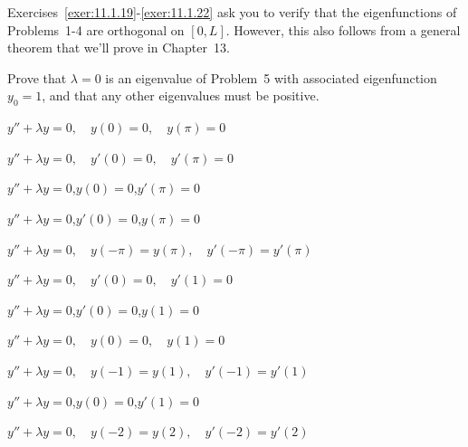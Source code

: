 Exercises~\ref{exer:11.1.19}-\ref{exer:11.1.22} ask you to verify that the eigenfunctions of
Problems~1-4 are orthogonal on $[0,L]$. However, this also follows from a general theorem that we'll
prove in Chapter~13.


\exercises

\begin{exerciselist}
  \item\label{exer:11.1.1} Prove that $\lambda=0$ is an eigenvalue of Problem~5 with associated
        eigenfunction $y_{0}=1$, and that any other eigenvalues must be positive. 


  \item\label{exer:11.1.2} $y''+\lambda y=0,\quad y(0)=0,\quad y(\pi)=0$

  \item\label{exer:11.1.3} $y''+\lambda y=0,\quad y'(0)=0,\quad y'(\pi)=0$

  \item\label{exer:11.1.4} $y''+\lambda y=0$,\quad $y(0)=0$,\quad $y'(\pi)=0$

  \item\label{exer:11.1.5} $y''+\lambda y=0$,\quad $y'(0)=0$,\quad $y(\pi)=0$

  \item\label{exer:11.1.6} $y''+\lambda y=0,\quad y(-\pi)=y(\pi),\quad y'(-\pi)=y'(\pi)$

  \item\label{exer:11.1.7} $y''+\lambda y=0,\quad y'(0)=0,\quad y'(1)=0$

  \item\label{exer:11.1.8} $y''+\lambda y=0$,\quad $y'(0)=0$,\quad $y(1)=0$

  \item\label{exer:11.1.9} $y''+\lambda y=0,\quad y(0)=0,\quad y(1)=0$

  \item\label{exer:11.1.10} $y''+\lambda y=0,\quad y(-1)=y(1),\quad y'(-1)=y'(1)$

  \item\label{exer:11.1.11} $y''+\lambda y=0$,\quad $y(0)=0$,\quad $y'(1)=0$

  \item\label{exer:11.1.12} $y''+\lambda y=0,\quad y(-2)=y(2),\quad y'(-2)=y'(2)$


\end{exerciselist}
